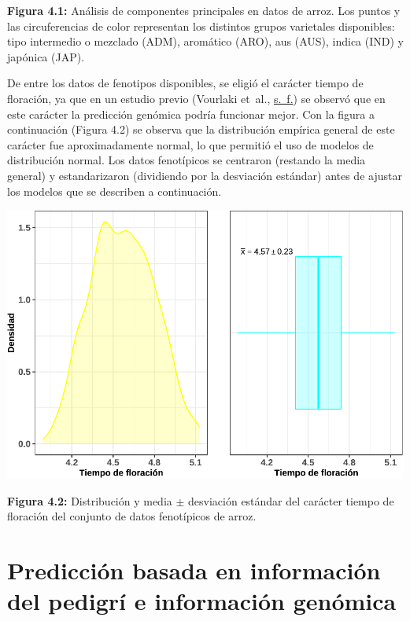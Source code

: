 \documentclass[11pt,spanish,a4paper,oneside,]{book} %
\begin{document}
\noindent 
\textbf{Figura 4.1:} Análisis de componentes principales en datos de arroz. Los puntos y las circuferencias de color representan los distintos grupos varietales disponibles: tipo intermedio o mezclado (ADM), aromático (ARO), aus (AUS), indica (IND) y japónica (JAP).

\hspace*{1em}

De entre los datos de fenotipos disponibles, se eligió el carácter tiempo de floración, ya que en un estudio previo (Vourlaki et~al., \protect\hyperlink{ref-cite:26}{s.~f.}) se observó que en este carácter la predicción genómica podría funcionar mejor. Con la figura a continuación (Figura 4.2) se observa que la distribución empírica general de este carácter fue aproximadamente normal, lo que permitió el uso de modelos de distribución normal. Los datos fenotípicos se centraron (restando la media general) y estandarizaron (dividiendo por la desviación estándar) antes de ajustar los modelos que se describen a continuación.

\begin{center}\includegraphics[width=1\linewidth]{figures/Graf_feno_2} \end{center}

\noindent
\textbf{Figura 4.2:} Distribución y media \(\pm\) desviación estándar del carácter tiempo de floración del conjunto de datos fenotípicos de arroz.

\hypertarget{predicciuxf3n-basada-en-informaciuxf3n-del-pedigruxed-e-informaciuxf3n-genuxf3mica}{%
\section{Predicción basada en información del pedigrí e información genómica}\label{predicciuxf3n-basada-en-informaciuxf3n-del-pedigruxed-e-informaciuxf3n-genuxf3mica}}
\end{document}
